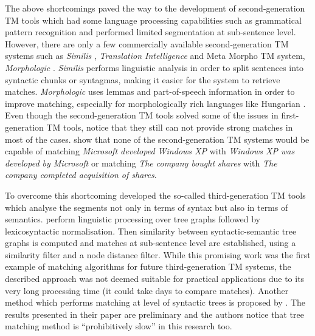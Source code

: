 The above shortcomings paved the way to the development of second-generation TM tools which had some language processing capabilities such as grammatical pattern recognition and performed limited segmentation at sub-sentence level. However, there are only a few commercially available second-generation TM systems such as \textit{Similis} \cite{planas2005similis}, \textit{Translation Intelligence} \cite{gronroos2005bringing} and Meta Morpho TM system, \textit{Morphologic} \cite{hodasz2005metamorpho}. \textit{Similis} \cite{planas2005similis} performs linguistic analysis in order to split sentences into syntactic chunks or syntagmas, making it easier for the system to retrieve matches. \textit{Morphologic} uses lemmas and part-of-speech information in order to improve matching, especially for morphologically rich languages like Hungarian \cite{hodasz2005metamorpho}. Even though the second-generation TM tools solved some of the issues in first-generation TM tools, \citet{mitkov2008improving} notice that they still can not provide strong matches in most of the cases. \citet{mitkov2008improving} show that none of the second-generation TM systems would be capable of matching \textit{Microsoft developed Windows XP} with \textit{Windows XP was developed by Microsoft} or matching \textit{The company bought shares} with \textit{The company completed acquisition of shares}. 


To overcome this shortcoming \citet{pekar2007new} developed the so-called third-generation TM tools which analyse the segments not only in terms of syntax but also in terms of semantics. \citet{pekar2007new} perform linguistic processing over tree graphs \cite{szpektor-etal-2004-scaling,10.1007/978-3-540-30586-6_1} followed by lexicosyntactic normalisation. Then similarity between syntactic-semantic tree graphs is computed and matches at sub-sentence level are established, using a similarity filter and a node distance filter. While this promising work was the first example of matching algorithms for future third-generation TM systems, the described approach was not deemed suitable for practical applications due to its very long processing time (it could take days to compare matches). Another method which performs matching at level of syntactic trees is proposed by \citet{vanallemeersch2014improving}. The results presented in their paper are preliminary and the authors notice that tree matching method is ``prohibitively slow'' in this research too.

